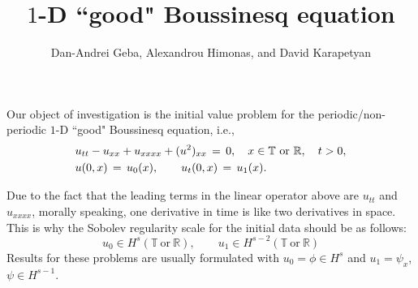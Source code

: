 \documentclass[12pt,reqno]{amsart}
\numberwithin{equation}{section}  %
\numberwithin{figure}{section}
\begin{document}
\title{$1$-D ``good" Boussinesq equation}

\author{Dan-Andrei Geba, Alexandrou Himonas, and David Karapetyan}

\address{Department of Mathematics, University of Rochester, Rochester, NY 14627}
\address{Department of Mathematics, University of Notre Dame, Notre Dame, IN 46556}
\address{Department of Mathematics, University of Notre Dame, Notre Dame, IN 46556}
\date{}



\maketitle

Our object of investigation is the initial value problem for the periodic/non-periodic $1$-D ``good" Boussinesq equation, i.e.,
\begin{equation}
\aligned
&u_{tt}-u_{xx}+u_{xxxx}+(u^2)_{xx}\,=\,0, \quad x\in \mathbb{T}\ \text{or} \ \mathbb{R}, \quad t>0,\\
&u(0,x)\,=\,u_0(x),\qquad u_t(0,x)\,=\,u_1(x).\endaligned
\label{main}
\end{equation}

Due to the fact that the leading terms in the linear operator above are $u_{tt}$ and $u_{xxxx}$, morally speaking, one derivative in time is like two derivatives in space. This is why the Sobolev regularity scale for the initial data should be as follows:
\[
u_0\in H^s(\mathbb{T}\ \text{or} \ \mathbb{R}), \qquad u_1\in H^{s-2}(\mathbb{T}\ \text{or} \ \mathbb{R})
\]
Results for these problems are usually formulated with $u_0=\phi \in H^s$ and $u_1=\psi_x$, $\psi\in H^{s-1}$.
\end{document}
